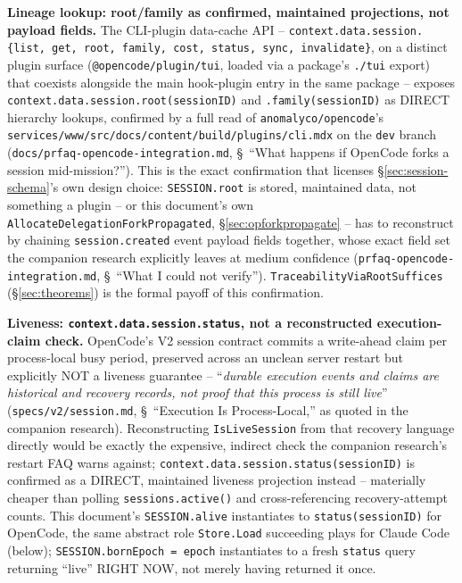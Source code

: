 \documentclass[a4paper,10pt,fleqn]{article}
\newcommand{\fpath}[1]{\texttt{#1}}
\newcommand{\field}[1]{\texttt{#1}}
\begin{document}
\textbf{Lineage lookup: root/family as confirmed, maintained
projections, not payload fields.} The CLI-plugin data-cache API --
\field{context.data.session.\{list, get, root, family, cost, status,
sync, invalidate\}}, on a distinct plugin surface
(\fpath{@opencode/plugin/tui}, loaded via a package's \field{./tui}
export) that coexists alongside the main hook-plugin entry in the same
package -- exposes \field{context.data.session.root(sessionID)} and
\field{.family(sessionID)} as DIRECT hierarchy lookups, confirmed by a
full read of \fpath{anomalyco/opencode}'s
\fpath{services/www/src/docs/content/build/plugins/cli.mdx} on the
\field{dev} branch (\fpath{docs/prfaq-opencode-integration.md},
\S~``What happens if OpenCode forks a session mid-mission?''). This is
the exact confirmation that licenses \S\ref{sec:session-schema}'s own
design choice: \field{SESSION.root} is stored, maintained data, not
something a plugin -- or this document's own
\field{AllocateDelegationForkPropagated}, \S\ref{sec:opforkpropagate}
-- has to reconstruct by chaining \field{session.created} event payload
fields together, whose exact field set the companion research explicitly
leaves at medium confidence (\fpath{prfaq-opencode-integration.md},
\S~``What I could not verify''). \field{TraceabilityViaRootSuffices}
(\S\ref{sec:theorems}) is the formal payoff of this confirmation.

\textbf{Liveness: \field{context.data.session.status}, not a
reconstructed execution-claim check.} OpenCode's V2 session contract
commits a write-ahead claim per process-local busy period, preserved
across an unclean server restart but explicitly NOT a liveness
guarantee -- ``\emph{durable execution events and claims are historical
and recovery records, not proof that this process is still live}''
(\fpath{specs/v2/session.md}, \S~``Execution Is Process-Local,'' as
quoted in the companion research). Reconstructing \field{IsLiveSession}
from that recovery language directly would be exactly the expensive,
indirect check the companion research's restart FAQ warns against;
\field{context.data.session.status(sessionID)} is confirmed as a
DIRECT, maintained liveness projection instead -- materially cheaper
than polling \field{sessions.active()} and cross-referencing
recovery-attempt counts. This document's \field{SESSION.alive}
instantiates to \field{status(sessionID)} for OpenCode, the same
abstract role \field{Store.Load} succeeding plays for Claude Code
(below); \field{SESSION.bornEpoch = epoch} instantiates to a fresh
\field{status} query returning ``live'' RIGHT NOW, not merely having
returned it once.
\end{document}

